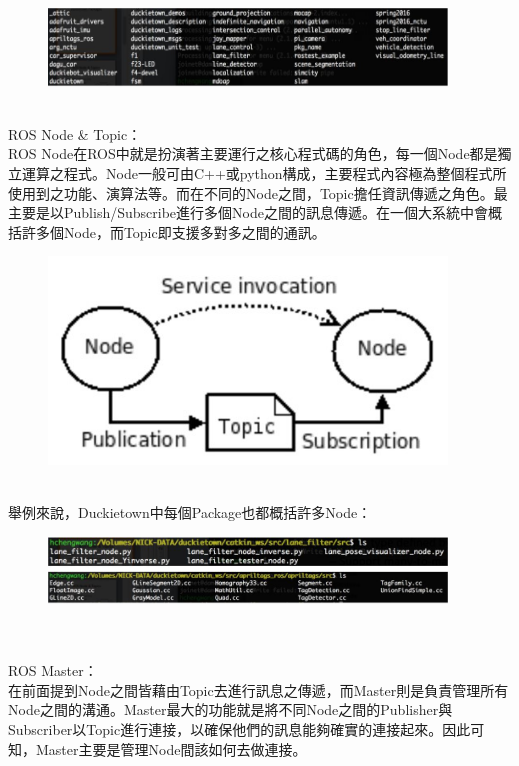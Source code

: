 \documentclass{article}
\begin{document}
\begin{figure}[htp]
    \begin{center}
        \includegraphics[width=300pt]{pic/圖片17.jpg}
    \end{center}
\end{figure}
\\ROS Node & Topic：
\\ROS Node在ROS中就是扮演著主要運行之核心程式碼的角色，每一個Node都是獨立運算之程式。Node一般可由C++或python構成，主要程式內容極為整個程式所使用到之功能、演算法等。而在不同的Node之間，Topic擔任資訊傳遞之角色。最主要是以Publish/Subscribe進行多個Node之間的訊息傳遞。在一個大系統中會概括許多個Node，而Topic即支援多對多之間的通訊。
\begin{figure}[htp]
    \begin{center}
        \includegraphics[width=300pt]{pic/圖片18.jpg}
    \end{center}
\end{figure}
\\舉例來說，Duckietown中每個Package也都概括許多Node：
\begin{figure}[htp]
    \begin{center}
        \includegraphics[width=300pt]{pic/圖片19.jpg}
    \end{center}
\end{figure}
\\
\\ROS Master：
\\在前面提到Node之間皆藉由Topic去進行訊息之傳遞，而Master則是負責管理所有Node之間的溝通。Master最大的功能就是將不同Node之間的Publisher與Subscriber以Topic進行連接，以確保他們的訊息能夠確實的連接起來。因此可知，Master主要是管理Node間該如何去做連接。
\end{document}
